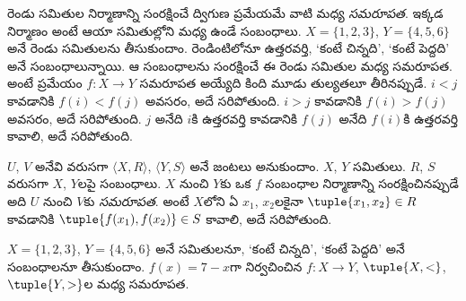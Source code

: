 \documentclass[../../../include/open-logic-section]{subfiles}
\begin{document}

\begin{explain}
రెండు సమితుల నిర్మాణాన్ని సంరక్షించే ద్విగుణ ప్రమేయమే వాటి మధ్య \emph{సమరూపత}. ఇక్కడ నిర్మాణం అంటే ఆయా సమితుల్లోని  మధ్య ఉండే సంబంధాలు. $X=\{1,2,3\}$, $Y=\{4,5,6\}$ అనే రెండు సమితులను తీసుకుందాం. రెండింటిలోనూ ఉత్తరవర్తి, ‘కంటే చిన్నది’, ‘కంటే పెద్దది’ అనే సంబంధాలున్నాయి. ఆ సంబంధాలను సంరక్షించే  ఈ రెండు సమితుల మధ్య సమరూపత. అంటే  ప్రమేయం $f \colon X \to Y$ సమరూపత అయ్యేది కింది మూడు తుల్యతలూ తీరినప్పుడే. $i<j$ కావడానికి $f(i)<f(j)$ అవసరం, అదే సరిపోతుంది. $i>j$ కావడానికి $f(i)>f(j)$ అవసరం, అదే సరిపోతుంది. $j$ అనేది $i$కి ఉత్తరవర్తి కావడానికి $f(j)$ అనేది $f(i)$కి ఉత్తరవర్తి కావాలి, అదే సరిపోతుంది.
\end{explain}

\begin{defn}[సమరూపత]
$U$, $V$ అనేవి వరుసగా $\langle X, R\rangle$, $\langle Y, S\rangle$ అనే జంటలు అనుకుందాం. $X$, $Y$ సమితులు. $R$, $S$ వరుసగా $X$, $Y$లపై సంబంధాలు. $X$ నుంచి $Y$కు ఒక  $f$ సంబంధాల నిర్మాణాన్ని సంరక్షించినప్పుడే అది $U$ నుంచి $V$కు \emph{సమరూపత}. అంటే $X$లోని ఏ $x_{1}$, $x_{2}$లకైనా $\tuple{x_1,x_2} \in R$ కావడానికి $\tuple{f(x_1),f(x_2)} \in S$ కావాలి, అదే సరిపోతుంది.
\end{defn}

\begin{ex}
$X=\{1,2,3\}$, $Y=\{4,5,6\}$ అనే సమితులనూ, ‘కంటే చిన్నది’, ‘కంటే పెద్దది’ అనే సంబంధాలనూ తీసుకుందాం. $f(x) = 7-x$గా నిర్వచించిన $f\colon X \to Y$, $\tuple{X,<}$, $\tuple{Y,>}$ల మధ్య సమరూపత.
\end{ex}
\end{document}
